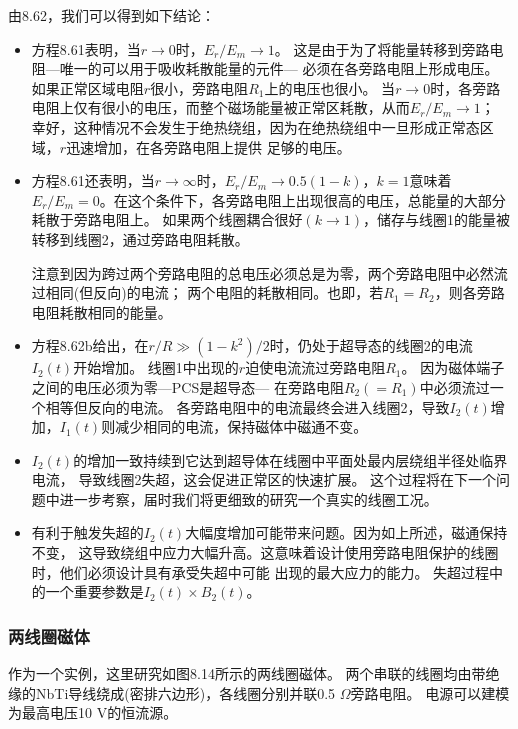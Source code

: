 由8.62，我们可以得到如下结论：
\begin{itemize}
		\item 方程8.61表明，当$r\rightarrow 0$时，$E_r/E_m\rightarrow 1$。
		这是由于为了将能量转移到旁路电阻---唯一的可以用于吸收耗散能量的元件---
		必须在各旁路电阻上形成电压。
		如果正常区域电阻$r$很小，旁路电阻$R_1$上的电压也很小。
		当$r\rightarrow 0$时，各旁路电阻上仅有很小的电压，而整个磁场能量被正常区耗散，从而$E_r/E_m\rightarrow 1$；
		幸好，这种情况不会发生于绝热绕组，因为在绝热绕组中一旦形成正常态区域，$r$迅速增加，在各旁路电阻上提供
		足够的电压。
		\item 方程8.61还表明，当$r\rightarrow\infty$时，$E_r/E_m\rightarrow 0.5(1-k)$，$k=1$意味着
		$E_r/E_m=0$。在这个条件下，各旁路电阻上出现很高的电压，总能量的大部分耗散于旁路电阻上。
		如果两个线圈耦合很好$(k\rightarrow 1)$，储存与线圈1的能量被转移到线圈2，通过旁路电阻耗散。
		
		注意到因为跨过两个旁路电阻的总电压必须总是为零，两个旁路电阻中必然流过相同(但反向)的电流；
		两个电阻的耗散相同。也即，若$R_1=R_2$，则各旁路电阻耗散相同的能量。
		\item 方程8.62b给出，在$r/R\gg (1-k^2)/2$时，仍处于超导态的线圈2的电流$I_2(t)$开始增加。
		线圈1中出现的$r$迫使电流流过旁路电阻$R_1$。
		因为磁体端子之间的电压必须为零---PCS是超导态---
		在旁路电阻$R_2(=R_1)$中必须流过一个相等但反向的电流。
		各旁路电阻中的电流最终会进入线圈2，导致$I_2(t)$增加，$I_1(t)$则减少相同的电流，保持磁体中磁通不变。
		\item $I_2(t)$的增加一致持续到它达到超导体在线圈中平面处最内层绕组半径处临界电流，
		导致线圈2失超，这会促进正常区的快速扩展。
		这个过程将在下一个问题中进一步考察，届时我们将更细致的研究一个真实的线圈工况。
		\item  有利于触发失超的$I_2(t)$大幅度增加可能带来问题。因为如上所述，磁通保持不变，
		这导致绕组中应力大幅升高。这意味着设计使用旁路电阻保护的线圈时，他们必须设计具有承受失超中可能
		出现的最大应力的能力。
		失超过程中的一个重要参数是$I_2(t)\times B_2(t)$。
	\end{itemize}

\subsubsection*{两线圈磁体}
作为一个实例，这里研究如图8.14所示的两线圈磁体。
两个串联的线圈均由带绝缘的NbTi导线绕成(密排六边形)，各线圈分别并联0.5 $\Omega$旁路电阻。
电源可以建模为最高电压10 V的恒流源。

